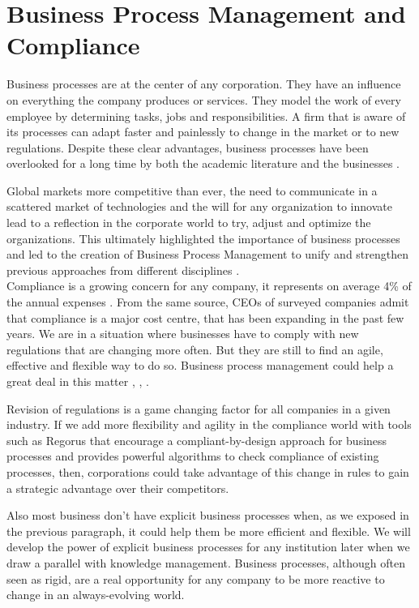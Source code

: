 \documentclass[10pt]{report}
\begin{document}
\section{Business Process Management and Compliance}

Business processes are at the center of any corporation. They have an influence on everything the company produces or services. They model the work of every employee by determining tasks, jobs and responsibilities. A firm that is aware of its processes can adapt faster and painlessly to change in the market or to new regulations. Despite these clear advantages, business processes have been overlooked for a long time by both the academic literature and the businesses \autocite{dumas2013}.

Global markets more competitive than ever, the need to communicate in a scattered market of technologies and the will for any organization to innovate lead to a reflection in the corporate world to try, adjust and optimize the organizations. This ultimately highlighted the importance of business processes and led to the creation of Business Process Management to unify and strengthen previous approaches from different disciplines \autocite{dumas2013}.\\

Compliance is a growing concern for any company, it represents on average 4\% of the annual expenses \autocite{IBT2011}. From the same source, CEOs of surveyed companies admit that compliance is a major cost centre, that has been expanding in the past few years. We are in a situation where businesses have to comply with new regulations that are changing more often. But they are still to find an agile, effective and flexible way to do so. Business process management could help a great deal in this matter \autocite{goedertier2006}, \autocite{dumas2013}, \autocite{jeston2014}.

Revision of regulations is a game changing factor for all companies in a given industry. If we add more flexibility and agility in the compliance world with tools such as Regorus that encourage a compliant-by-design approach for business processes and provides powerful algorithms to check compliance of existing processes, then, corporations could take advantage of this change in rules to gain a strategic advantage over their competitors.

Also most business don't have explicit business processes when, as we exposed in the previous paragraph, it could help them be more efficient and flexible. We will develop the power of explicit business processes for any institution later when we draw a parallel with knowledge management. Business processes, although often seen as rigid, are a real opportunity for any company to be more reactive to change in an always-evolving world.
\end{document}
